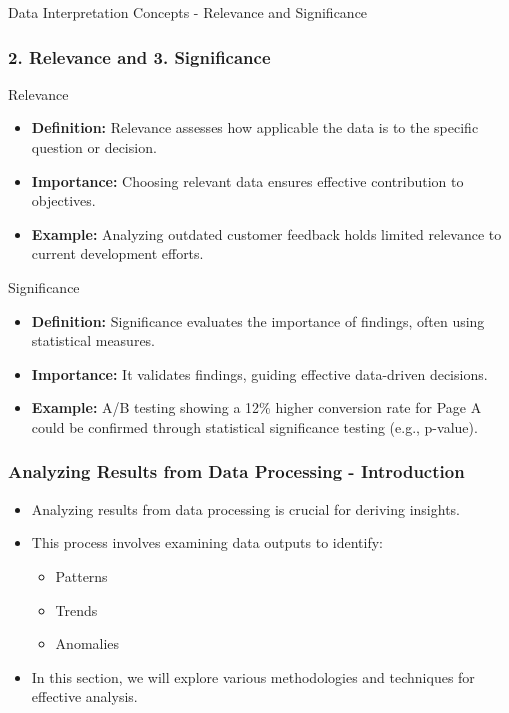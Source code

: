 \documentclass[aspectratio=169]{beamer}
\begin{document}
\begin{frame}[fragile]{Data Interpretation Concepts - Relevance and Significance}
    \frametitle{2. Relevance and 3. Significance}
    \begin{block}{Relevance}
        \begin{itemize}
            \item \textbf{Definition:} Relevance assesses how applicable the data is to the specific question or decision.
            \item \textbf{Importance:} Choosing relevant data ensures effective contribution to objectives.
            \item \textbf{Example:} Analyzing outdated customer feedback holds limited relevance to current development efforts.
        \end{itemize}
    \end{block}

    \begin{block}{Significance}
        \begin{itemize}
            \item \textbf{Definition:} Significance evaluates the importance of findings, often using statistical measures.
            \item \textbf{Importance:} It validates findings, guiding effective data-driven decisions.
            \item \textbf{Example:} A/B testing showing a 12\% higher conversion rate for Page A could be confirmed through statistical significance testing (e.g., p-value).
        \end{itemize}
    \end{block}
\end{frame}

\begin{frame}[fragile]
    \frametitle{Analyzing Results from Data Processing - Introduction}
    \begin{itemize}
        \item Analyzing results from data processing is crucial for deriving insights.
        \item This process involves examining data outputs to identify:
            \begin{itemize}
                \item Patterns
                \item Trends
                \item Anomalies
            \end{itemize}
        \item In this section, we will explore various methodologies and techniques for effective analysis.
    \end{itemize}
\end{frame}
\end{document}
